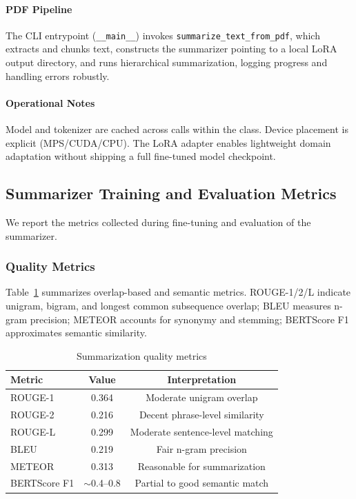 \documentclass[conference]{IEEEtran}
\begin{document}
\paragraph*{PDF Pipeline}
The CLI entrypoint (\texttt{\_\_main\_\_}) invokes \texttt{summarize\_text\_from\_pdf}, which extracts and chunks text, constructs the summarizer pointing to a local LoRA output directory, and runs hierarchical summarization, logging progress and handling errors robustly.

\paragraph*{Operational Notes}
Model and tokenizer are cached across calls within the class. Device placement is explicit (MPS/CUDA/CPU). The LoRA adapter enables lightweight domain adaptation without shipping a full fine-tuned model checkpoint.

\subsection{Summarizer Training and Evaluation Metrics}
We report the metrics collected during fine-tuning and evaluation of the summarizer.

\subsubsection{Quality Metrics}
Table~\ref{tab:sum-metrics} summarizes overlap-based and semantic metrics. ROUGE-1/2/L indicate unigram, bigram, and longest common subsequence overlap; BLEU measures n-gram precision; METEOR accounts for synonymy and stemming; BERTScore F1 approximates semantic similarity.

\begin{table}[t]
\centering
\caption{Summarization quality metrics}
\begin{tabular}{lcc}
\toprule
Metric & Value & Interpretation \\
\midrule
ROUGE-1 & 0.364 & Moderate unigram overlap \\
ROUGE-2 & 0.216 & Decent phrase-level similarity \\
ROUGE-L & 0.299 & Moderate sentence-level matching \\
BLEU & 0.219 & Fair n-gram precision \\
METEOR & 0.313 & Reasonable for summarization \\
BERTScore F1 & $\sim$0.4--0.8 & Partial to good semantic match \\
\bottomrule
\end{tabular}
\label{tab:sum-metrics}
\end{table}
\end{document}
